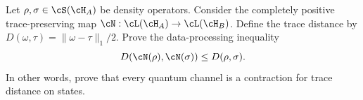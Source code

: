 Let $\rho,\sigma\in\cS(\cH_A)$ be density operators. Consider the completely positive trace-preserving map $\cN:\cL(\cH_A)\to\cL(\cH_B)$. Define the trace distance by $D(\omega,\tau)=\|\omega-\tau\|_1/2$.
Prove the data-processing inequality
$$
D(\cN(\rho),\cN(\sigma))
\leq
D(\rho,\sigma).
$$
In other words, prove that every quantum channel is a contraction for trace distance on states.
